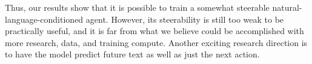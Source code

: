 Thus, our results show that it is possible to train a somewhat steerable natural-language-conditioned agent. However, its steerability is still too weak to be practically useful, and it is far from what we believe could be accomplished with more research, data, and training compute. Another exciting research direction is to have the model predict future text as well as just the next action.